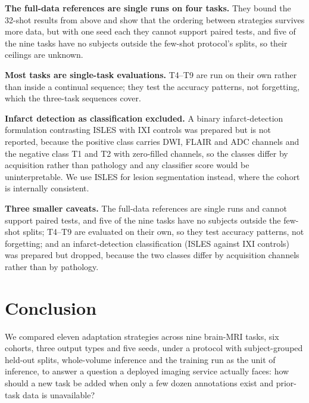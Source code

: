 \iffull\documentclass[journal]{IEEEtran}\else\documentclass[journal,twoside,web]{ieeecolor}\usepackage{generic}\fi
\begin{document}
\iffull  %
\textbf{The full-data references are single runs on four tasks.} They bound the 32-shot results from above and show that the ordering between strategies survives more data, but with one seed each they cannot support paired tests, and five of the nine tasks have no subjects outside the few-shot protocol's splits, so their ceilings are unknown.

\textbf{Most tasks are single-task evaluations.} T4--T9 are run on their own rather than inside a continual sequence; they test the accuracy patterns, not forgetting, which the three-task sequences cover.

\textbf{Infarct detection as classification excluded.} A binary infarct-detection formulation contrasting ISLES with IXI controls was prepared but is not reported, because the positive class carries DWI, FLAIR and ADC channels and the negative class T1 and T2 with zero-filled channels, so the classes differ by acquisition rather than pathology and any classifier score would be uninterpretable. We use ISLES for lesion segmentation instead, where the cohort is internally consistent.

\else
\textbf{Three smaller caveats.} The full-data references are single runs and cannot support paired tests, and five of the nine tasks have no subjects outside the few-shot splits; T4--T9 are evaluated on their own, so they test accuracy patterns, not forgetting; and an infarct-detection classification (ISLES against IXI controls) was prepared but dropped, because the two classes differ by acquisition channels rather than by pathology.

\fi  %

\section{Conclusion}
\label{sec:conclusion}

\iffull  %
We compared eleven adaptation strategies across nine brain-MRI tasks, six cohorts, three output types and five seeds, under a protocol with subject-grouped held-out splits, whole-volume inference and the training run as the unit of inference, to answer a question a deployed imaging service actually faces: how should a new task be added when only a few dozen annotations exist and prior-task data is unavailable?
\end{document}

